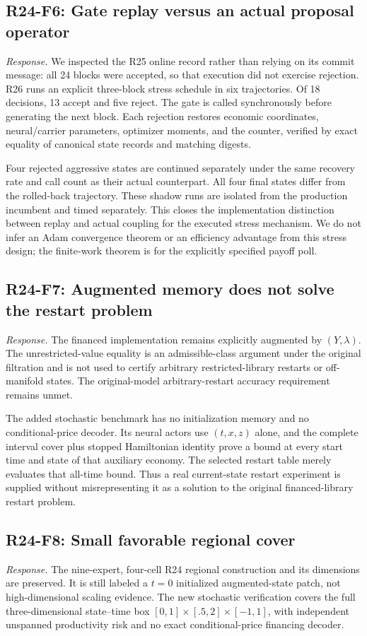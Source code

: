 \subsection{R24-F6: Gate replay versus an actual proposal operator}
\emph{Response.} We inspected the R25 online record rather than relying on its commit message: all 24 blocks were accepted, so that execution did not exercise rejection. R26 runs an explicit three-block stress schedule in six trajectories. Of 18 decisions, 13 accept and five reject. The gate is called synchronously before generating the next block. Each rejection restores economic coordinates, neural/carrier parameters, optimizer moments, and the counter, verified by exact equality of canonical state records and matching digests.

Four rejected aggressive states are continued separately under the same recovery rate and call count as their actual counterpart. All four final states differ from the rolled-back trajectory. These shadow runs are isolated from the production incumbent and timed separately. This closes the implementation distinction between replay and actual coupling for the executed stress mechanism. We do not infer an Adam convergence theorem or an efficiency advantage from this stress design; the finite-work theorem is for the explicitly specified payoff poll.

\subsection{R24-F7: Augmented memory does not solve the restart problem}
\emph{Response.} The financed implementation remains explicitly augmented by $(Y,\lambda)$. The unrestricted-value equality is an admissible-class argument under the original filtration and is not used to certify arbitrary restricted-library restarts or off-manifold states. The original-model arbitrary-restart accuracy requirement remains unmet.

The added stochastic benchmark has no initialization memory and no conditional-price decoder. Its neural actors use $(t,x,z)$ alone, and the complete interval cover plus stopped Hamiltonian identity prove a bound at every start time and state of that auxiliary economy. The selected restart table merely evaluates that all-time bound. Thus a real current-state restart experiment is supplied without misrepresenting it as a solution to the original financed-library restart problem.

\subsection{R24-F8: Small favorable regional cover}
\emph{Response.} The nine-expert, four-cell R24 regional construction and its dimensions are preserved. It is still labeled a $t=0$ initialized augmented-state patch, not high-dimensional scaling evidence. The new stochastic verification covers the full three-dimensional state--time box $[0,1]\times[.5,2]\times[-1,1]$, with independent unspanned productivity risk and no exact conditional-price financing decoder.

